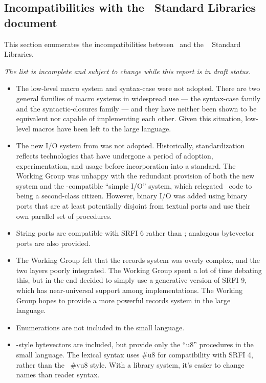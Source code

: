 \subsection*{Incompatibilities with the \rsixrs\ Standard Libraries document}

This section enumerates the incompatibilities between \rsevenrs\ and
the \rsixrs~\cite{R6RS} Standard Libraries.

{\em The list is incomplete and subject to change while this report is in draft status.}

\begin{itemize}

\item The low-level macro system and {\cf syntax-case} were not adopted. There
are two general families of macro systems in widespread use --- the
{\cf syntax-case} family and the {\cf syntactic-closures} family --- and they have
neither been shown to be equivalent nor capable of implementing each
other. Given this situation,
low-level macros have been left to the large language.

\item The new I/O system from \rsixrs{} was not adopted. 
Historically, standardization reflects technologies that have undergone
a period of adoption, experimentation, and usage before incorporation
into a standard.  The Working Group was
unhappy with the redundant
provision of both the new system and the \rfivers{}-compatible ``simple I/O''
system, which
relegated \rfivers\ code to being a second-class
citizen.
However, binary I/O was added using binary ports that are
at least potentially disjoint from
textual ports and use their own parallel set of procedures.

\item String ports are compatible with SRFI 6 rather than \rsixrs; analogous
bytevector ports are also provided.

\item The Working Group felt that the \rsixrs{} records system was overly complex, and the two layers
poorly integrated. The Working Group spent a lot of time debating this, but in the
end decided to simply use a generative version of SRFI 9, which has
near-universal support among implementations. The Working Group hopes to provide a more
powerful records system in the large language.

\item Enumerations are not included in the small language.

\item \rsixrs{}-style bytevectors are included, but provide only the ``u8'' procedures in the small
language.  The lexical syntax uses {\cf \#u8} for compatibility
with SRFI 4, rather than the \rsixrs~{\cf \#vu8} style.
With a library system, it's easier to change names than reader syntax.


\end{itemize}

